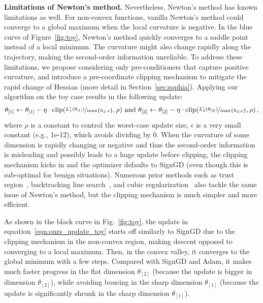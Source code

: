 \textbf{Limitations of Newton's method.} Nevertheless, Newton’s method has known limitations as well. For non-convex functions, vanilla Newton’s method could converge to a global maximum when the local curvature is negative. In the blue curve of Figure~\ref{fig:toy}, Newton’s method quickly converges to a saddle point instead of a local minimum. The curvature might also change rapidly along the trajectory, making the second-order information unreliable. To address these limitations, we propose considering only pre-conditioners that capture positive curvature, and introduce a pre-coordinate clipping mechanism to mitigate the rapid change of Hessian (more detail in Section~\ref{sec:sophia}). Applying our algorithm on the toy case results in the following update: 
\begin{align}
\theta_{[1]} \leftarrow \theta_{[1]} - \eta \cdot \clip(\nicefrac{ L'_1(\theta_{[1]})}{\max\{h_1,\epsilon\}} ,\rho)\ \textup{and}\ \theta_{[2]} \leftarrow \theta_{[2]} - \eta \cdot \clip(\nicefrac{ L'_2(\theta_{[2]})}{\max\{h_2,\epsilon\}},\rho)\,,\label{eqn:ours_update_toy}
\end{align}
where $\rho$ is a constant to control the worst-case update size, $\epsilon$ is a very small constant (e.g., 1e-12), which avoids dividing by 0. When the curvature of some dimension is rapidly changing or negative and thus the second-order information is misleading and possibly leads to a huge update before clipping, the clipping mechanism kicks in and the optimizer defaults to SignGD (even though this is sub-optimal for benign situations).
Numerous prior methods such as trust region~\citep{conn2000trust}, backtracking line search~\citep{boyd2004convex}, and cubic regularization~\citep{nesterov2006cubic} also tackle the same issue of Newton's method, but the clipping mechanism is much simpler and more efficient. 

As shown in the black curve in Fig.~\ref{fig:toy}, the update in equation~\eqref{eqn:ours_update_toy} starts off similarly to SignGD due to the clipping mechanism in the non-convex region, making descent opposed to converging to a local maximum. Then, in the convex valley, it converges to the global minimum with a few steps. Compared with SignGD and Adam, it makes much faster progress in the flat dimension $\theta_{[2]}$ (because the update is bigger in dimension $\theta_{[2]}$), while avoiding boucing in the sharp dimension $\theta_{[1]}$ (because the update is significantly shrunk in the sharp dimension $\theta_{[1]}$).




